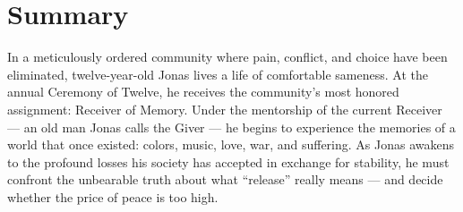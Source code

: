 \section{Summary}

In a meticulously ordered community where pain, conflict, and choice have been eliminated, twelve-year-old Jonas lives a life of comfortable sameness. At the annual Ceremony of Twelve, he receives the community's most honored assignment: Receiver of Memory. Under the mentorship of the current Receiver --- an old man Jonas calls the Giver --- he begins to experience the memories of a world that once existed: colors, music, love, war, and suffering. As Jonas awakens to the profound losses his society has accepted in exchange for stability, he must confront the unbearable truth about what ``release'' really means --- and decide whether the price of peace is too high.

\vspace{6pt}

